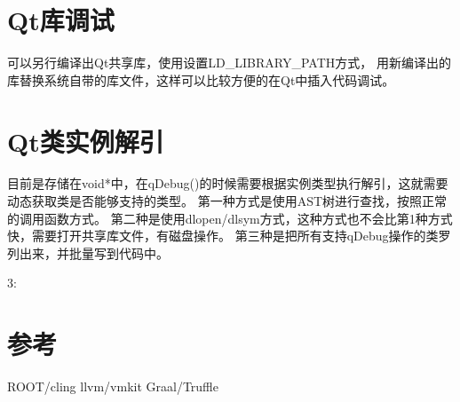 \section{Qt库调试}
可以另行编译出Qt共享库，使用设置LD\_LIBRARY\_PATH方式，
用新编译出的库替换系统自带的库文件，这样可以比较方便的在Qt中插入代码调试。

\section{Qt类实例解引}
目前是存储在void*中，在qDebug()的时候需要根据实例类型执行解引，这就需要动态获取类是否能够支持的类型。
第一种方式是使用AST树进行查找，按照正常的调用函数方式。
第二种是使用dlopen/dlsym方式，这种方式也不会比第1种方式快，需要打开共享库文件，有磁盘操作。
第三种是把所有支持qDebug操作的类罗列出来，并批量写到代码中。

3:



\section{参考}
ROOT/cling
llvm/vmkit
Graal/Truffle

